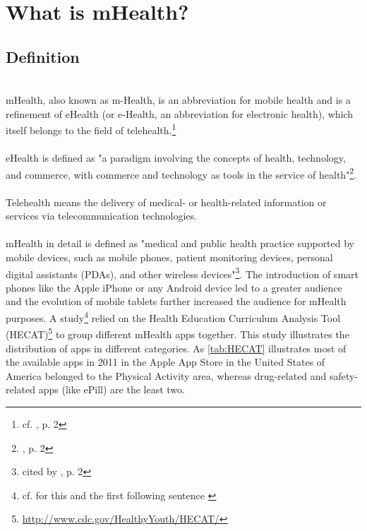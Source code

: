 \section{What is mHealth?}

\subsection{Definition}
\\
mHealth, also known as m-Health, is an abbreviation for mobile health and is a refinement of eHealth (or e-Health, an abbreviation for electronic health), which itself belongs to the field of telehealth.\footnote{cf. \cite{MartinezPerez.2013}, p. 2}
\\
\\
eHealth is defined as "a paradigm involving the concepts of health, technology, and commerce, with commerce and technology as tools in the service of health"\footnote{\cite{MartinezPerez.2013}, p. 2}.
\\
\\
Telehealth means the delivery of medical- or health-related information or services via telecommunication technologies.
\\
\\
mHealth in detail is defined as "medical and public health practice supported by mobile devices, such as mobile phones, patient monitoring devices, personal digital assistants (PDAs), and other wireless devices"\footnote{\cite{WorldHealthOrganization.2011} cited by \cite{MartinezPerez.2013}, p. 2}. The introduction of smart phones like the Apple iPhone or any Android device led to a greater audience and the evolution of mobile tablets further increased the audience for mHealth purposes. A study\footnote{cf. for this and the first following sentence \cite{West.2012}} relied on the Health Education Curriculum Analysis Tool (HECAT)\footnote{\url{http://www.cdc.gov/HealthyYouth/HECAT/}} to group different mHealth apps together. This study illustrates the distribution of apps in different categories. As \ref{tab:HECAT} illustrates most of the available apps in 2011 in the Apple App Store in the United States of America belonged to the Physical Activity area, whereas drug-related and safety-related apps (like ePill) are the least two. 
